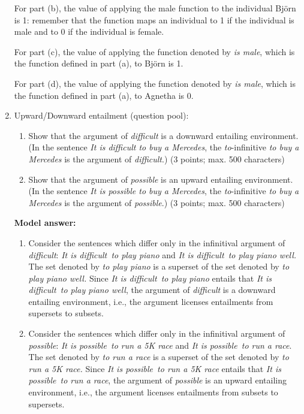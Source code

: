 \documentclass[a4,11pt]{article}
\begin{document}
\begin{enumerate}[leftmargin = 12pt]
For part (b), the value of applying the {\sf male} function to the individual Bj\"orn is 1: remember that the function maps an individual to 1 if the individual is male and to 0 if the individual is female.

For part (c), the value of applying the function denoted by {\em is male}, which is the function defined in part (a), to Bj\"orn is 1.

For part (d), the value of applying the function denoted by {\em is male}, which is the function defined in part (a), to Agnetha is 0.

\item Upward/Downward entailment (question pool):

\begin{enumerate}
\item  Show that the argument of \textit{difficult} is a downward entailing environment. (In the sentence \textit{It
is difficult to buy a Mercedes}, the {\em to}-infinitive {\em to buy a Mercedes} is the argument of {\em difficult}.) (3
points; max. 500 characters)
\item Show that the argument of \textit{possible} is an upward entailing environment. (In the sentence {\em It
is possible to buy a Mercedes}, the {\em to}-infinitive {\em to buy a Mercedes} is the argument of {\em possible}.) (3
points; max. 500 characters)
\end{enumerate}

{\bf Model answer:} 
\begin{enumerate}
\item Consider the sentences which differ only in the infinitival argument of \textit{difficult}: \textit{It is difficult to play piano} and \textit{It is difficult to play piano well.} The set denoted by \textit{to play piano} is a superset of the set denoted by \textit{to play piano well.}
Since \textit{It is difficult to play piano} entails that \textit{It is difficult to play piano well}, the argument of \textit{difficult} is a downward entailing environment, i.e., the argument licenses entailments from supersets to subsets.
\item Consider the sentences which differ only in the infinitival argument of \textit{possible}: \textit{It is possible to run a 5K race}  and \textit{It is possible to run a race}. The set denoted by \textit{to run a race} is a superset of the set denoted by \textit{to run a 5K race.} Since \textit{It is possible to run a 5K race} entails that  \textit{It is possible to run a race}, the argument of \textit{possible} is an upward entailing environment, i.e., the argument licenses entailments from subsets to supersets.
\end{enumerate}

\end{enumerate}
\end{document}
